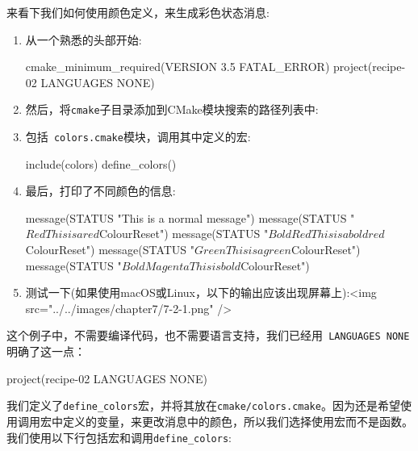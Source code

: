 
来看下我们如何使用颜色定义，来生成彩色状态消息:

\begin{enumerate}
\item 从一个熟悉的头部开始:

\begin{codebox}[cmake]
cmake_minimum_required(VERSION 3.5 FATAL_ERROR)
project(recipe-02 LANGUAGES NONE)
\end{codebox}

\item 然后，将\texttt{cmake}子目录添加到CMake模块搜索的路径列表中:


\item 包括\texttt{ colors.cmake}模块，调用其中定义的宏:

\begin{codebox}[cmake]
include(colors)
define_colors()
\end{codebox}

\item 最后，打印了不同颜色的信息:

\begin{codebox}[cmake]
message(STATUS "This is a normal message")
message(STATUS "${Red}This is a red${ColourReset}")
message(STATUS "${BoldRed}This is a bold red${ColourReset}")
message(STATUS "${Green}This is a green${ColourReset}")
message(STATUS "${BoldMagenta}This is bold${ColourReset}")
\end{codebox}

\item 测试一下(如果使用macOS或Linux，以下的输出应该出现屏幕上):\textless{}img src="../../images/chapter7/7-2-1.png" /\textgreater{}

\end{enumerate}


这个例子中，不需要编译代码，也不需要语言支持，我们已经用\texttt{ LANGUAGES NONE }明确了这一点：

\begin{codebox}[cmake]
project(recipe-02 LANGUAGES NONE)
\end{codebox}

我们定义了\texttt{define\_colors}宏，并将其放在\texttt{cmake/colors.cmake}。因为还是希望使用调用宏中定义的变量，来更改消息中的颜色，所以我们选择使用宏而不是函数。我们使用以下行包括宏和调用\texttt{define\_colors}:

